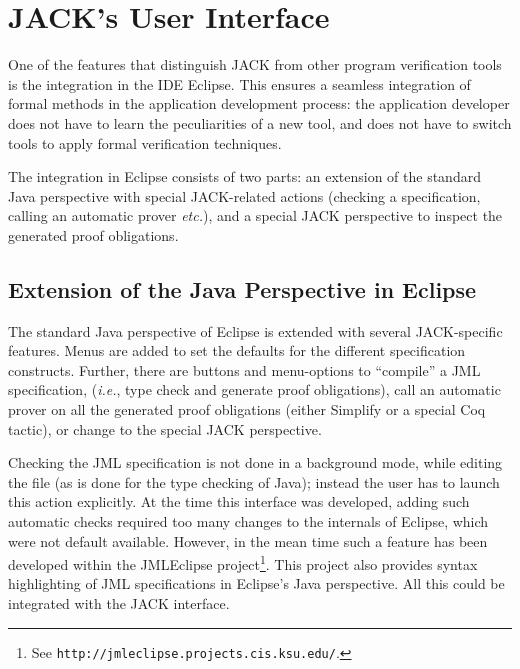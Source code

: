 
\section{JACK's User Interface}\label{SecUI}

One of the features that distinguish JACK from other program
verification tools is the integration in the IDE Eclipse. This ensures
a seamless integration of formal methods in the application
development process: the application developer does not have to learn
the peculiarities of a new tool, and does not have to switch tools to
apply formal verification techniques.

The integration in Eclipse consists of two parts: an extension of the
standard Java perspective with special JACK-related actions (checking a
specification, calling an automatic prover \emph{etc.}), and a
special JACK perspective to inspect the generated proof
obligations.

\subsection{Extension of the Java Perspective in Eclipse}

The standard Java perspective of Eclipse is extended with several
JACK-specific features. Menus are added to set the defaults for the
different specification constructs. Further, there are buttons and
menu-options to ``compile'' a JML specification, (\emph{i.e.}, type
check and generate proof obligations), call an automatic prover on all
the generated proof obligations (either Simplify or a special
Coq tactic), or change to the special JACK perspective.  

Checking the JML specification is not done in a background mode, while
editing the file (as is done for the type checking of Java);
instead the user has to launch this action explicitly. 
At the time this interface was developed,
adding such automatic checks required too many changes to the
internals of Eclipse, which were not default available. However, in
the mean time such a feature has been developed within the JMLEclipse
project\footnote{See
\texttt{http://jmleclipse.projects.cis.ksu.edu/}.}. This project also
provides syntax highlighting of JML specifications in Eclipse's Java
perspective. All this could be integrated with the JACK interface. 


